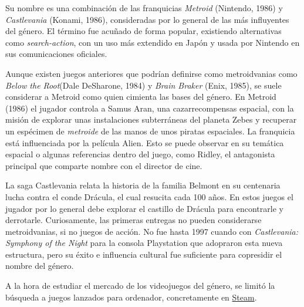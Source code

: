 Su nombre es una combinación de las franquicias \textit{Metroid} (Nintendo, 1986) y \textit{Castlevania} (Konami, 1986), consideradas por lo general de las más influyentes del género. El término fue acuñado de forma popular, existiendo alternativas como \textit{search-action}, con un uso más extendido en Japón y usada por Nintendo en sus comunicaciones oficiales.

Aunque existen juegos anteriores que podrían definirse como metroidvanias como \textit{Below the Root}(Dale DeSharone, 1984) y \textit{Brain Braker} (Enix, 1985), se suele considerar a Metroid como quien cimienta las bases del género. En Metroid (1986) el jugador controla a Samus Aran, una cazarrecompensas espacial, con la misión de explorar unas instalaciones subterráneas del planeta Zebes y recuperar un espécimen de \textit{metroide} de las manos de unos piratas espaciales. La franquicia está influenciada por la película Alien. Esto se puede observar en su temática espacial o algunas referencias dentro del juego, como Ridley, el antagonista principal que comparte nombre con el director de cine.

La saga Castlevania relata la historia de la familia Belmont en su centenaria lucha contra el conde Drácula, el cual resucita cada 100 años. En estos juegos el jugador por lo general debe explorar el castillo de Drácula para encontrarle y derrotarle. Curiosamente, las primeras entregas no pueden considerarse metroidvanias, si no juegos de acción. No fue hasta 1997 cuando con \textit{Castlevania: Symphony of the Night} para la consola Playstation que adopraron esta nueva estructura, pero su éxito e influencia cultural fue suficiente para copresidir el nombre del género.

A la hora de estudiar el mercado de los videojuegos del género, se limitó la búsqueda a juegos lanzados para ordenador, concretamente en \href{https://store.steampowered.com/?l=spanish}{Steam}.